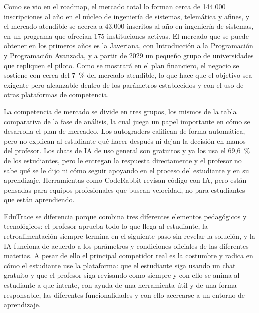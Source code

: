 \documentclass[letterpaper, 10 pt, conference]{ieeeconf}
\begin{document}
Como se vio en el roadmap, el mercado total lo forman cerca de 144.000 inscripciones al año en el núcleo de ingeniería de sistemas, telemática y afines, y el mercado atendible se acerca a 43.000 inscritos al año en ingeniería de sistemas, en un programa que ofrecían 175 instituciones activas.
El mercado que se puede obtener en los primeros años es la Javeriana, con Introducción a la Programación y Programación Avanzada, y a partir de 2029 un pequeño grupo de universidades que repliquen el piloto.
Como se mostrará en el plan financiero, el negocio se sostiene con cerca del 7~\% del mercado atendible, lo que hace que el objetivo sea exigente pero alcanzable dentro de los parámetros establecidos y con el uso de otras plataformas de competencia.

La competencia de mercado se divide en tres grupos, los mismos de la tabla comparativa de la fase de análisis, la cual juega un papel importante en cómo se desarrolla el plan de mercadeo.
Los autograders califican de forma automática, pero no explican al estudiante qué hacer después ni dejan la decisión en manos del profesor.
Los chats de IA de uso general son gratuitos y ya los usa el 69,6~\% de los estudiantes, pero le entregan la respuesta directamente y el profesor no sabe qué se le dijo ni cómo seguir apoyando en el proceso del estudiante y en su aprendizaje.
Herramientas como CodeRabbit revisan código con IA, pero están pensadas para equipos profesionales que buscan velocidad, no para estudiantes que están aprendiendo.

EduTrace se diferencia porque combina tres diferentes elementos pedagógicos y tecnológicos: el profesor aprueba todo lo que llega al estudiante, la retroalimentación siempre termina en el siguiente paso sin revelar la solución, y la IA funciona de acuerdo a los parámetros y condiciones oficiales de las diferentes materias.
A pesar de ello el principal competidor real es la costumbre y radica en cómo el estudiante use la plataforma: que el estudiante siga usando un chat gratuito y que el profesor siga revisando como siempre y con ello se anima al estudiante a que intente, con ayuda de una herramienta útil y de una forma responsable, 
las diferentes funcionalidades y con ello acercarse a un entorno de aprendizaje.
\end{document}
